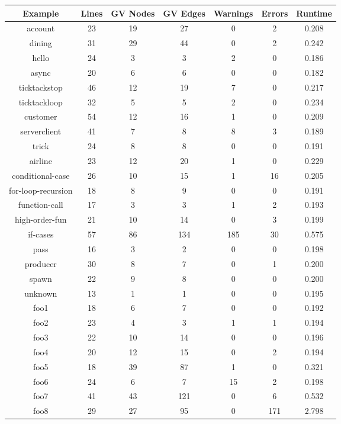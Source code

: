 
\begin{table}[h]
    \centering
    \begin{tabular}{|c|c|c|c|c|c|c|}
    \hline
    Example & Lines & GV Nodes & GV Edges & Warnings & Errors & Runtime \\ 
    \hline
    account & 23 & 19 & 27 & 0 & 2 & 0.208 \\ 
    dining & 31 & 29 & 44 & 0 & 2 & 0.242 \\ 
    hello & 24 & 3 & 3 & 2 & 0 & 0.186 \\ 
    async & 20 & 6 & 6 & 0 & 0 & 0.182 \\ 
    ticktackstop & 46 & 12 & 19 & 7 & 0 & 0.217 \\ 
    ticktackloop & 32 & 5 & 5 & 2 & 0 & 0.234 \\ 
    customer & 54 & 12 & 16 & 1 & 0 & 0.209 \\ 
    serverclient & 41 & 7 & 8 & 8 & 3 & 0.189 \\ 
    trick & 24 & 8 & 8 & 0 & 0 & 0.191 \\ 
    airline & 23 & 12 & 20 & 1 & 0 & 0.229 \\ 
    conditional-case & 26 & 10 & 15 & 1 & 16 & 0.205 \\ 
    for-loop-recursion & 18 & 8 & 9 & 0 & 0 & 0.191 \\ 
    function-call & 17 & 3 & 3 & 1 & 2 & 0.193 \\ 
    high-order-fun & 21 & 10 & 14 & 0 & 3 & 0.199 \\ 
    if-cases & 57 & 86 & 134 & 185 & 30 & 0.575 \\ 
    pass & 16 & 3 & 2 & 0 & 0 & 0.198 \\ 
    producer & 30 & 8 & 7 & 0 & 1 & 0.200 \\ 
    spawn & 22 & 9 & 8 & 0 & 0 & 0.200 \\ 
    unknown & 13 & 1 & 1 & 0 & 0 & 0.195 \\ 
    foo1 & 18 & 6 & 7 & 0 & 0 & 0.192 \\ 
    foo2 & 23 & 4 & 3 & 1 & 1 & 0.194 \\ 
    foo3 & 22 & 10 & 14 & 0 & 0 & 0.196 \\ 
    foo4 & 20 & 12 & 15 & 0 & 2 & 0.194 \\ 
    foo5 & 18 & 39 & 87 & 1 & 0 & 0.321 \\ 
    foo6 & 24 & 6 & 7 & 15 & 2 & 0.198 \\ 
    foo7 & 41 & 43 & 121 & 0 & 6 & 0.532 \\ 
    foo8 & 29 & 27 & 95 & 0 & 171 & 2.798 \\ 

\end{tabular}
\end{table}
